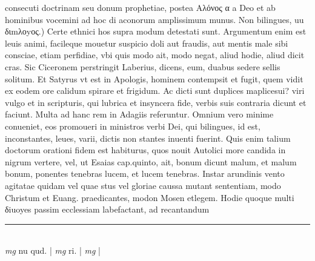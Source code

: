 \documentclass{article}
\begin{document}
\begin{pages}
consecuti doctrinam seu donum prophetiae, postea Αλόνος α a Deo et ab hominibus vocemini ad hoc di aconorum amplissimum munus.  \pend\pstart Non bilingues, uu διmλοyος.) Certe ethnici hos supra modum detestati sunt. Argumentum enim est leuis animi, facileque mouetur suspicio doli aut fraudis, aut mentis male sibi consciae, etiam perfidiae, vbi quis modo ait, modo negat, aliud hodie, aliud dicit cras. Sic Ciceronem perstringit Laberius, dicens, eum, duabus sedere sellis solitum. Et Satyrus vt est in Apologis, hominem contempsit et fugit, quem vidit ex eodem ore calidum spirare et frigidum. Ac dicti sunt duplices maplicesui? viri vulgo et in scripturis, qui lubrica et insyncera fide, verbis suis contraria dicunt et faciunt. Multa ad hanc rem in Adagiis referuntur. Omnium vero minime conueniet, eos promoueri in ministros verbi Dei, qui bilingues, id est, inconstantes, leues, varii, dictis non stantes inuenti fuerint. Quis enim talium doctorum orationi fidem est habiturus, quos nouit Autolici more candida in nigrum vertere, vel, ut Esaias cap.quinto, ait, bonum dicunt malum, et malum bonum, ponentes tenebras lucem, et lucem tenebras. Instar arundinis vento agitatae quidam vel quae stus vel gloriae caussa mutant sententiam, modo Christum et Euang. praedicantes, modon Mosen etlegem. Hodie quoque multi δiuoyes passim ecclessiam labefactant, ad recantandum  \pend
\vspace{0.5cm}\noindent
\vspace{0.2cm}\rule{1cm}{0.2pt}\\ 
\hspace{0.2cm}\textit{mg}
\footnotesize nu qud. 
\normalsize| 
\hspace{0.2cm}\textit{mg}
\footnotesize ri. 
\normalsize| 
\hspace{0.2cm}\textit{mg}
\footnotesize 
\normalsize| 

\end{pages}
\end{document}

